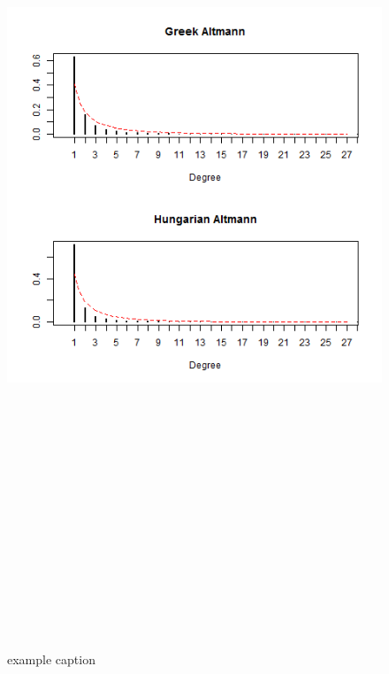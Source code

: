 \documentclass[paper=a4, fontsize=11pt]{scrartcl} %
\theoremstyle{plain}
\begin{document}
\begin{figure}[htbp] %
   \centering
   \includegraphics[width=15cm,height=27cm]{Altman_4} %
   \caption{example caption}
   \label{fig:example}
\end{figure}
\end{document}
